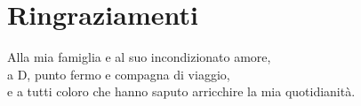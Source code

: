 \chapter*{Ringraziamenti}
{\small Alla mia famiglia e al suo incondizionato amore,\\ a D, punto fermo e compagna di viaggio,\\e a tutti coloro che hanno saputo arricchire la mia quotidianità.\\ }    